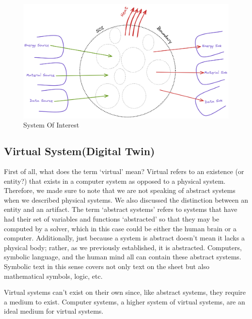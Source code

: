 \documentclass[9pt,conference]{IEEEtran}
\begin{document}
    \begin{figure}[htbp]
        \includegraphics[width=\columnwidth]{SOI.png}
        \caption{System Of Interest}
        \label{SOI}
    \end{figure}

    \subsection{Virtual System(Digital Twin)}

    First of all, what does the term `virtual' mean? Virtual refers to an existence (or entity?) that exists in a computer system as opposed to a physical system. 
    Therefore, we made sure to note that we are not speaking of abstract systems when we described physical systems. 
    We also discussed the distinction between an entity and an artifact. The term `abstract systems'  refers to systems that have had their set of variables and functions 
    `abstracted'  so that they may be computed by a solver, which in this case could be either the human brain or a computer.
    Additionally, just because a system is abstract doesn't mean it lacks a physical body; rather, as we previously established, 
    it is abstracted. Computers, symbolic language, and the human mind all can contain these abstract systems.
    Symbolic text in this sense covers not only text on the sheet but also mathematical symbols, logic, etc.

    Virtual systems can't exist on their own since, like abstract systems, they require a medium to exist.
    Computer systems, a higher system of virtual systems, are an ideal medium for virtual systems. 
\end{document}
